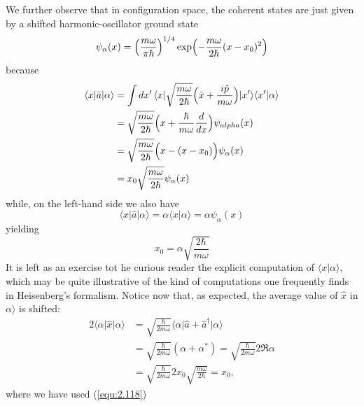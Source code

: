 We further observe that in configuration space, the coherent
states are just given by a shifted harmonic-oscillator
ground state
\begin{equation}
  \psi_{\alpha}(x) =
  \Bigl(\frac{m\omega}{\pi\hbar}\Bigr)^{1/4}
  \exp\Bigl(-\frac{m\omega}{2\hbar}(x-x_0)^2\Bigr)
  \label{equ:2.115}
\end{equation}
because
  \begin{alignat}{2}
    \langle x\vert \hat{a}\vert \alpha\rangle  &= \int dx' \, \langle x\vert 
    \sqrt{\frac{m\omega}{2\hbar}} \Bigl(
    \hat{x} + \frac{i\hat{p}}{m\omega}
    \Bigr)\vert x'\rangle  \langle x'\vert \alpha\rangle \nonumber\\
    &=
    \sqrt{\frac{m\omega}{2\hbar}}
    \Bigl(
      x + \frac{\hbar}{m\omega}\frac{d}{dx}
    \Bigr)
    \psi_{alpha}(x)\nonumber\\
    &=
    \sqrt{\frac{m\omega}{2\hbar}}
    \Bigl(
      x-(x-x_0)
      \Bigr)\psi_{\alpha}(x)\nonumber\\
      &=
      x_0
      \sqrt{\frac{m\omega}{2\hbar}} \psi_{\alpha}(x)
      \label{equ:2.116}
  \end{alignat}
while, on the left-hand side we also have
\begin{equation}
  \langle x\vert \hat{a}\vert \alpha\rangle  = \alpha\langle x\vert \alpha\rangle  =
  \alpha\psi_{\alpha}(x)
  \label{equ:2.117}
\end{equation}
yielding
\begin{equation}
  x_0 = \alpha \sqrt{\frac{2\hbar}{m\omega}}
  \label{equ:2.118}
\end{equation}
It is left as an exercise tot he curious reader the explicit
computation of $\langle x\vert \alpha\rangle $, which may be quite illustrative
of the kind of computations one frequently finds in
Heisenberg's formalism.
Notice now that, as expected, the average value of $\hat{x}$
in $\alpha\rangle $ is shifted:
  \begin{alignat}{2}
    \langle \alpha\vert \hat{x}\vert \alpha\rangle  &= 
    \sqrt{\frac{\hbar}{2m\omega}}
    \langle \alpha\vert \hat{a}+\hat{a}^{\dagger}\vert \alpha\rangle  \nonumber\\
    &=
    \sqrt{\frac{\hbar}{2m\omega}}
    (\alpha + \alpha^*) = 
    \sqrt{\frac{\hbar}{2m\omega}} 2 \Re \alpha \nonumber\\
    &=
    \sqrt{\frac{\hbar}{2m\omega}}
    2x_0 \sqrt{\frac{m\omega}{2\hbar}} = x_0,
    \label{equ:2.119}
  \end{alignat}
where we have used (\ref{equ:2.118})
